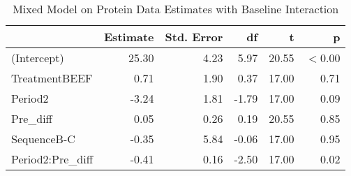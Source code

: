 \begin{table}[hbt]

\caption{\label{tab:proteinDataEstimates}Mixed Model on Protein Data Estimates with Baseline Interaction}
\centering
\begin{tabular}[t]{>{}l|rrrrr}
\toprule
 & Estimate & Std. Error & df & t & p\\
\midrule
(Intercept) & 25.30 & 4.23 & 5.97 & 20.55 & $<$0.00\\
TreatmentBEEF & 0.71 & 1.90 & 0.37 & 17.00 & 0.71\\
Period2 & -3.24 & 1.81 & -1.79 & 17.00 & 0.09\\
Pre\_diff & 0.05 & 0.26 & 0.19 & 20.55 & 0.85\\
SequenceB-C & -0.35 & 5.84 & -0.06 & 17.00 & 0.95\\
Period2:Pre\_diff & -0.41 & 0.16 & -2.50 & 17.00 & 0.02\\
\bottomrule
\end{tabular}
\end{table}
